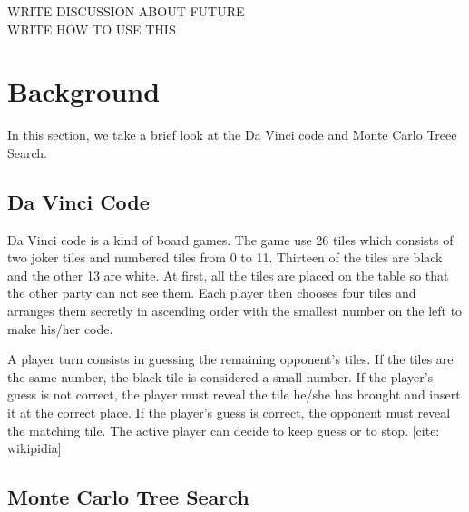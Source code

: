 \documentclass[conference]{IEEEtran}
\begin{document}
WRITE DISCUSSION ABOUT FUTURE
\\WRITE HOW TO USE THIS


 
\section{Background}
In this section, we take a brief look at the Da Vinci code and Monte Carlo Treee Search. 
\subsection{Da Vinci Code} \label{sec:davinci}
Da Vinci code is a kind of board games. 
The game use 26 tiles which consists of two joker tiles and numbered tiles from 0 to 11. 
Thirteen of the tiles are black and the other 13 are white.
At first, all the tiles are placed on the table so that the other party can not see them.
Each player then chooses four tiles and arranges them secretly in ascending order with the smallest number on the left to make his/her code. 

A player turn consists in guessing the remaining opponent's tiles. 
If the tiles are the same number, the black tile is considered a small number.
If the player's guess is not correct, the player must reveal the tile he/she has brought and insert it at the correct place.
If the player's guess is correct, the opponent must reveal the matching tile.
The active player can decide to keep guess or to stop.
[cite: wikipidia]
\subsection{Monte Carlo Tree Search}
\end{document}
